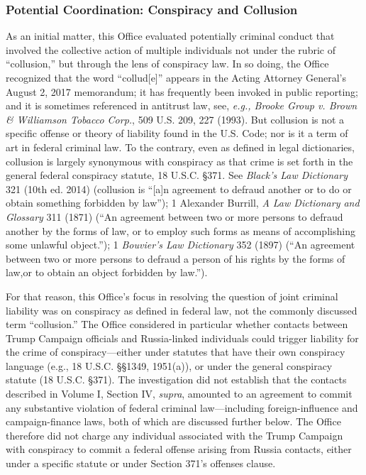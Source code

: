 \subsubsection{Potential Coordination: Conspiracy and Collusion}
As an initial matter, this Office evaluated potentially criminal conduct that involved the collective action of multiple individuals not under the rubric of ``collusion,'' but through the lens of conspiracy law.
In so doing, the Office recognized that the word ``collud[e]'' appears in the Acting Attorney General's August 2, 2017 memorandum; it has frequently been invoked in public reporting; and it is sometimes referenced in antitrust law, see, \textit{e.g., Brooke Group v. Brown \& Williamson Tobacco Corp.}, 509 U.S. 209, 227 (1993).
But collusion is not a specific offense or theory of liability found in the U.S. Code; nor is it a term of art in federal criminal law.
To the contrary, even as defined in legal dictionaries, collusion is largely synonymous with conspiracy as that crime is set forth in the general federal conspiracy statute, 18 U.S.C. \S 371.
See \textit{Black's Law Dictionary} 321 (10th ed. 2014) (collusion is ``[a]n agreement to defraud another or to do or obtain something forbidden by law''); 1 Alexander Burrill, \textit{A Law Dictionary and Glossary} 311 (1871) (``An agreement between two or more persons to defraud another by the forms of law, or to employ such forms as means of accomplishing some unlawful object.''); 1 \textit{Bouvier's Law Dictionary} 352 (1897) (``An agreement between two or more persons to defraud a person of his rights by the forms of law,or to obtain an object forbidden by law.'').

For that reason, this Office's focus in resolving the question of joint criminal liability was on conspiracy as defined in federal law, not the commonly discussed term ``collusion.''
The Office considered in particular whether contacts between Trump Campaign officials and Russia-linked individuals could trigger liability for the crime of conspiracy---either under statutes that have their own conspiracy language (e.g., 18 U.S.C. \S\S 1349, 1951(a)), or under the general conspiracy statute (18 U.S.C. \S 371).
The investigation did not establish that the contacts described in Volume I, Section IV, \textit{supra}, amounted to an agreement to commit any substantive violation of federal criminal law---including foreign-influence and campaign-finance laws, both of which are discussed further below.
The Office therefore did not charge any individual associated with the Trump Campaign with conspiracy to commit a federal offense arising from Russia contacts, either under a specific statute or under Section 371's offenses clause.

